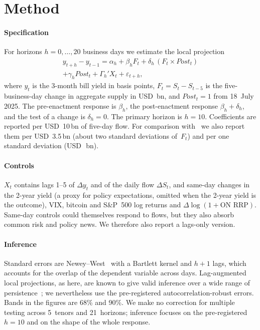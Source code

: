 \section{Method}\label{sec:method}

\paragraph*{Specification} For horizons $h=0,\dots,20$ business days we estimate the local projection~\cite{jorda2005}
\begin{multline}\label{eq:lp}
y_{t+h}-y_{t-1} = \alpha_h + \beta_h F_t + \delta_h\,(F_t\times \mathit{Post}_t) \\ + \gamma_h \mathit{Post}_t + \Gamma_h' X_t + \varepsilon_{t+h},
\end{multline}
where $y_t$ is the 3-month bill yield in basis points, $F_t=S_t-S_{t-5}$ is the five-business-day change in aggregate supply in USD~bn, and $\mathit{Post}_t=1$ from 18~July 2025. The pre-enactment response is $\beta_h$, the post-enactment response $\beta_h+\delta_h$, and the test of a change is $\delta_h=0$. The primary horizon is $h=10$. Coefficients are reported per USD~10\,bn of five-day flow. For comparison with~\cite{ahmed2025} we also report them per USD~3.5\,bn (about two standard deviations of~$F_t$) and per one standard deviation (USD~\flowSDbn{}\,bn).

\paragraph*{Controls} $X_t$ contains lags 1--5 of $\Delta y_t$ and of the daily flow $\Delta S_t$, and same-day changes in the 2-year yield (a proxy for policy expectations, omitted when the 2-year yield is the outcome), VIX, bitcoin and S\&P~500 log returns and $\Delta\log(1+\text{ON RRP})$. Same-day controls could themselves respond to flows, but they also absorb common risk and policy news. We therefore also report a lags-only version.

\paragraph*{Inference} Standard errors are Newey--West~\cite{neweywest1987} with a Bartlett kernel and $h+1$ lags, which accounts for the overlap of the dependent variable across days. Lag-augmented local projections, as here, are known to give valid inference over a wide range of persistence~\cite{montiel2021}; we nevertheless use the pre-registered autocorrelation-robust errors. Bands in the figures are 68\% and 90\%. We make no correction for multiple testing across 5~tenors and 21~horizons; inference focuses on the pre-registered $h=10$ and on the shape of the whole response.

